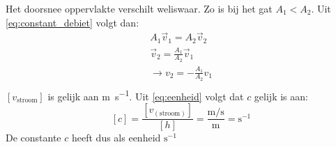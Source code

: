 \documentclass[numbers=endperiod]{scrartcl}
\begin{document}
Het doorsnee oppervlakte verschilt weliswaar. Zo is bij het gat $A_1 < A_2$. Uit \cref{eq:constant_debiet} volgt dan:
\begin{equation}\label{eq:v_h}
\begin{split}
    A_1\vec{v}_1 = A_2\vec{v}_2\\
    \vec{v}_2 = \frac{A_1}{A_2}\vec{v}_1\\
     \rightarrow v_2 = -\frac{A_1}{A_2}v_1\\
    \end{split}
    \end{equation}
$[v_{\text{stroom}}]$ is gelijk aan \si{\meter\per\second}. Uit \cref{eq:eenheid} volgt dat $c$ gelijk is aan:
\begin{equation}\label{eq:eenheid}
[c] = \frac{[v_{(\text{stroom})}]}{[h]} = \frac{\si{\meter\per\second}}{\si{\meter}} = \si{\second}^{-1}
\end{equation}
De constante $c$ heeft dus als eenheid $\si{\second}^{-1}$




\newpage
\end{document}
